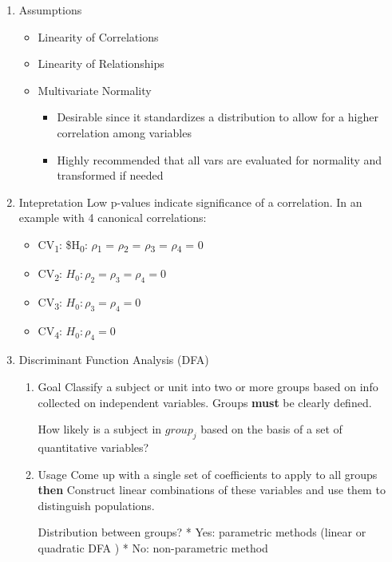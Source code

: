 \documentclass[11pt]{article}
\begin{document}
\begin{enumerate}
\item Assumptions
\label{sec:orgc3d04d1}
\begin{itemize}
\item Linearity of Correlations
\item Linearity of Relationships
\item Multivariate Normality

\begin{itemize}
\item Desirable since it standardizes a distribution to allow for a
higher correlation among variables
\item Highly recommended that all vars are evaluated for normality and
transformed if needed
\end{itemize}
\end{itemize}

\item Intepretation
\label{sec:orgb5e2da0}
Low p-values indicate significance of a correlation. In an example with
4 canonical correlations:
\begin{itemize}
\item CV\textsubscript{1}: \$H\textsubscript{0}: \(\rho\)\textsubscript{1} = \(\rho\)\textsubscript{2} = \(\rho\)\textsubscript{3} = \(\rho\)\textsubscript{4} = 0
\item CV\textsubscript{2}: \(H_0: \rho_2 = \rho_3 = \rho_4 = 0\)
\item CV\textsubscript{3}: \(H_0: \rho_3 = \rho_4 = 0\)
\item CV\textsubscript{4}: \(H_0: \rho_4 = 0\)
\end{itemize}

\item Discriminant Function Analysis (DFA)
\label{sec:orge4c233d}
\begin{enumerate}
\item Goal
\label{sec:org69f3983}
Classify a subject or unit into two or more groups based on info
collected on independent variables. Groups \textbf{must} be clearly defined.

How likely is a subject in \({group}_j\) based on the basis of a set of
quantitative variables?

\item Usage
\label{sec:orga1c81d5}
Come up with a single set of coefficients to apply to all groups \textbf{then}
Construct linear combinations of these variables and use them to
distinguish populations.

Distribution between groups? * Yes: parametric methods (linear or
quadratic DFA ) * No: non-parametric method


\end{enumerate}
\end{enumerate}
\end{document}

